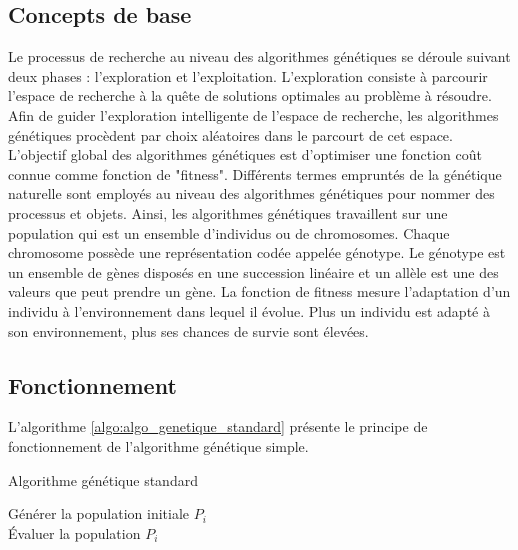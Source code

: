 	\subsection{Concepts de base}
	Le processus de recherche au niveau des algorithmes génétiques se déroule suivant deux phases : l’exploration et l’exploitation. L'exploration consiste à parcourir l'espace de recherche à la quête de solutions optimales au problème à résoudre. Afin de guider l'exploration intelligente de l'espace de recherche, les algorithmes génétiques procèdent par choix aléatoires dans le parcourt de cet espace. L'objectif global des algorithmes génétiques est d'optimiser une fonction coût connue comme fonction de "fitness".
	Différents termes empruntés de la génétique naturelle sont employés au niveau des algorithmes génétiques pour nommer des processus et objets. Ainsi, les algorithmes génétiques travaillent sur une population qui est un ensemble d'individus ou de chromosomes. Chaque chromosome possède une représentation codée appelée génotype. Le génotype est un ensemble de gènes disposés en une succession linéaire et un allèle est une des valeurs que peut prendre un gène. La fonction de fitness mesure l'adaptation d'un individu à l'environnement dans lequel il évolue. Plus un individu est adapté à son environnement, plus ses chances de survie sont élevées.

	\subsection{Fonctionnement}
	
	L'algorithme \ref{algo:algo_genetique_standard} présente le principe de fonctionnement de l'algorithme génétique simple.\\
	 
	\begin{algorithm}[H]
 	\caption{Algorithme génétique standard \cite{Goncalves}}
 	\label{algo:algo_genetique_standard}
 	Générer la population initiale $P_{i}$ \\
 	Évaluer la population $P_{i}$ \\
	\end{algorithm}
	
